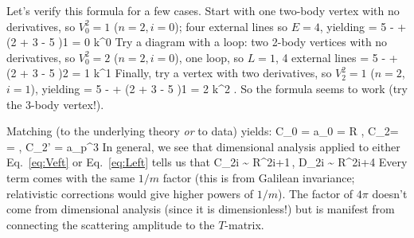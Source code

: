 Let's verify this formula for a few cases.
Start with one two-body vertex with no derivatives, so $V_0^2 = 1$ ($n=2,i=0$);
four external lines so $E=4$, yielding
 \beq
 \qquad
  \nu = 5 -    + (2 + 3 - 5 )1 = 0 
  \quad\Longrightarrow\quad k^0
\eeq
%
Try a diagram with a loop: two 2-body vertices with no derivatives,
so $V_0^2 = 2$ ($n=2,i=0$), one loop, so $L=1$, 4 external lines
 \beq
 \qquad
  \nu = 5 -    + (2 + 3 - 5 )2 = 1 
  \quad\Longrightarrow\quad k^1
\eeq
 Finally, try a vertex with two derivatives, so $V_2^2 = 1$ ($n=2$,$i=1$),
 yielding
 \beq
 \qquad
  \nu = 5 -    + (2 + 3 - 5 )1 = 2 
  \quad\Longrightarrow\quad k^2
  \;.
\eeq
So the formula seems to work (try the 3-body vertex!).


Matching (to the underlying theory \emph{or} to data) yields:
%
\beq
    C_0 = a_0
        = R\; ,
     \quad C_2=  
          =  
          \; ,  \quad
      C_2' =  a_p^3
              \quad
              \cdots
\eeq              
%
In general, we see that 
dimensional analysis applied to either Eq.~\eqref{eq:Veft} 
or Eq.~\eqref{eq:Left} tells us that
\beq
  C_{2i} \sim {} R^{2i+1}\,,
        \quad
              D_{2i} \sim 
               R^{2i+4} 
\eeq
%
Every term comes with the same $1/m$ factor (this is from Galilean invariance;
relativistic corrections would give higher powers of $1/m$). 
The factor of $4\pi$ doesn't come from dimensional analysis (since
it is dimensionless!) but is manifest from connecting 
the scattering amplitude to the $T$-matrix.


